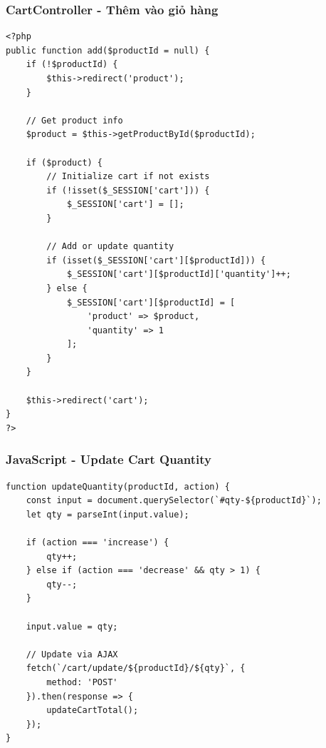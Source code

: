 \subsubsection{CartController - Thêm vào giỏ hàng}

\begin{lstlisting}[style=phpstyle, caption=Xử lý thêm sản phẩm vào giỏ]
<?php
public function add($productId = null) {
    if (!$productId) {
        $this->redirect('product');
    }
    
    // Get product info
    $product = $this->getProductById($productId);
    
    if ($product) {
        // Initialize cart if not exists
        if (!isset($_SESSION['cart'])) {
            $_SESSION['cart'] = [];
        }
        
        // Add or update quantity
        if (isset($_SESSION['cart'][$productId])) {
            $_SESSION['cart'][$productId]['quantity']++;
        } else {
            $_SESSION['cart'][$productId] = [
                'product' => $product,
                'quantity' => 1
            ];
        }
    }
    
    $this->redirect('cart');
}
?>
\end{lstlisting}

\subsubsection{JavaScript - Update Cart Quantity}

\begin{lstlisting}[style=jsstyle, caption=JavaScript xử lý tăng/giảm số lượng]
function updateQuantity(productId, action) {
    const input = document.querySelector(`#qty-${productId}`);
    let qty = parseInt(input.value);
    
    if (action === 'increase') {
        qty++;
    } else if (action === 'decrease' && qty > 1) {
        qty--;
    }
    
    input.value = qty;
    
    // Update via AJAX
    fetch(`/cart/update/${productId}/${qty}`, {
        method: 'POST'
    }).then(response => {
        updateCartTotal();
    });
}
\end{lstlisting}
